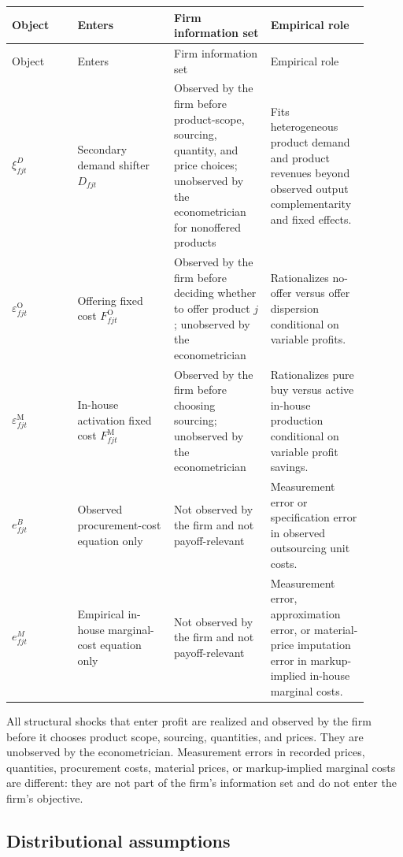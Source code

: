 \documentclass[11pt,a4paper]{article}
\newcommand{\M}{\mathrm{M}}
\newcommand{\OFC}{\mathrm{O}}
\begin{document}
\begin{longtable}{L{0.17\linewidth}L{0.25\linewidth}L{0.25\linewidth}L{0.23\linewidth}}
\toprule
Object & Enters & Firm information set & Empirical role \\
\midrule
\endfirsthead
\toprule
Object & Enters & Firm information set & Empirical role \\
\midrule
\endhead
$\xi^D_{fjt}$ & Secondary demand shifter $D_{fjt}$ & Observed by the firm before product-scope, sourcing, quantity, and price choices; unobserved by the econometrician for nonoffered products & Fits heterogeneous product demand and product revenues beyond observed output complementarity and fixed effects. \\
\addlinespace
$\varepsilon^{\OFC}_{fjt}$ & Offering fixed cost $F^{\OFC}_{fjt}$ & Observed by the firm before deciding whether to offer product $j$; unobserved by the econometrician & Rationalizes no-offer versus offer dispersion conditional on variable profits. \\
\addlinespace
$\varepsilon^{\M}_{fjt}$ & In-house activation fixed cost $F^{\M}_{fjt}$ & Observed by the firm before choosing sourcing; unobserved by the econometrician & Rationalizes pure buy versus active in-house production conditional on variable profit savings. \\
\addlinespace
$e^B_{fjt}$ & Observed procurement-cost equation only & Not observed by the firm and not payoff-relevant & Measurement error or specification error in observed outsourcing unit costs. \\
\addlinespace
$e^M_{fjt}$ & Empirical in-house marginal-cost equation only & Not observed by the firm and not payoff-relevant & Measurement error, approximation error, or material-price imputation error in markup-implied in-house marginal costs. \\
\bottomrule
\end{longtable}

All structural shocks that enter profit are realized and observed by the firm before it chooses product scope, sourcing, quantities, and prices. They are unobserved by the econometrician. Measurement errors in recorded prices, quantities, procurement costs, material prices, or markup-implied marginal costs are different: they are not part of the firm's information set and do not enter the firm's objective.

\subsection{Distributional assumptions}
\end{document}
